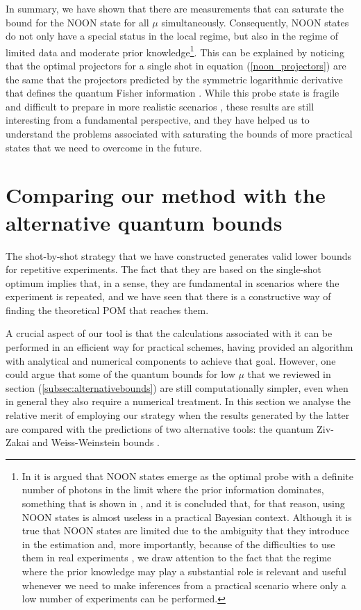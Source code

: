 In summary, we have shown that there are measurements that can saturate the bound for the NOON state for all $\mu$ simultaneously. Consequently, NOON states do not only have a special status in the local regime, but also in the regime of limited data and moderate prior knowledge\footnote{In \cite{jarzyna2016thesis} it is argued that NOON states emerge as the optimal probe with a definite number of photons in the limit where the prior information dominates, something that is shown in \cite{demkowicz2011}, and it is concluded that, for that reason, using NOON states is almost useless in a practical Bayesian context. Although it is true that NOON states are limited due to the ambiguity that they introduce in the estimation and, more importantly, because of the difficulties to use them in real experiments \cite{schafermeier2018}, we draw attention to the fact that the regime where the prior knowledge may play a substantial role is relevant and useful whenever we need to make inferences from a practical scenario where only a low number of experiments can be performed.}. This can be explained by noticing that the optimal projectors for a single shot in equation (\ref{noon_projectors}) are the same that the projectors predicted by the symmetric logarithmic derivative that defines the quantum Fisher information \cite{kolodynski2014}. While this probe state is fragile and difficult to prepare in more realistic scenarios \cite{schafermeier2018}, these results are still interesting from a fundamental perspective, and they have helped us to understand the problems associated with saturating the bounds of more practical states that we need to overcome in the future. 

\section{Comparing our method with the alternative quantum bounds}
\label{sec:alternativevssingleshot}

The shot-by-shot strategy that we have constructed generates valid lower bounds for repetitive experiments. The fact that they are based on the single-shot optimum implies that, in a sense, they are fundamental in scenarios where the experiment is repeated, and we have seen that there is a constructive way of finding the theoretical POM that reaches them. 

A crucial aspect of our tool is that the calculations associated with it can be performed in an efficient way for practical schemes, having provided an algorithm with analytical and numerical components to achieve that goal. However, one could argue that some of the quantum bounds for low $\mu$ that we reviewed in section (\ref{subsec:alternativebounds}) are still computationally simpler, even when in general they also require a numerical treatment. In this section we analyse the relative merit of employing our strategy when the results generated by the latter are compared with the predictions of two alternative tools: the quantum Ziv-Zakai and Weiss-Weinstein bounds \cite{tsang2012, tsang2016}.

